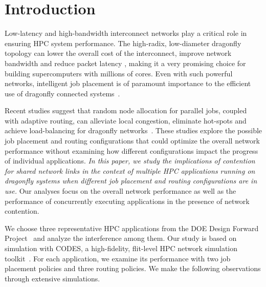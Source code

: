 \section{Introduction}
\label{sec:intro}

Low-latency and high-bandwidth interconnect networks play a critical role in ensuring HPC system performance. 
The high-radix, low-diameter dragonfly topology can lower the overall cost of the interconnect, improve network bandwidth and reduce packet latency \cite{dally-dragonfly}, 
making it a very promising choice for building supercomputers with millions of cores.
Even with such powerful networks, 
intelligent job placement is of paramount importance to the efficient use of dragonfly connected systems~\cite{bhatele2015, jain-sc14}.

Recent studies suggest that random node allocation for parallel jobs, coupled
with adaptive routing, can alleviate local congestion, eliminate hot-spots and achieve load-balancing for dragonfly networks~\cite{jain-sc14, bhatele-sc11, brandt2014}. 
These studies explore the possible job placement and routing configurations that could optimize the overall network performance without examining how different configurations impact the progress of individual applications.
\emph{In this paper, we study the implications of contention for shared network links in the context of multiple HPC applications running on dragonfly systems when different job placement and routing configurations are in use.}
Our analyses focus on the overall network performance as well as the performance of concurrently executing applications in the presence of network contention.



We choose three representative HPC applications from the DOE Design Forward Project~\cite{designforward-webpage} and analyze the interference among them. Our study is based on simulation with CODES, a high-fidelity, flit-level HPC network simulation toolkit~\cite{misbah-tpds}. 
For each application, we examine its performance with two job placement policies and three routing policies.
We make the following observations through extensive simulations.


